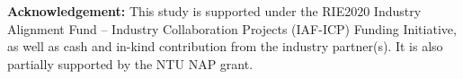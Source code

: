 \documentclass{article}
\begin{document}
\noindent\textbf{Acknowledgement:} This study is supported under the RIE2020 Industry Alignment Fund – Industry Collaboration Projects (IAF-ICP) Funding Initiative, as well as cash and in-kind contribution from the industry partner(s). It is also partially supported by the NTU NAP grant.



\clearpage
\medskip
{
\small


}
\clearpage
\end{document}
